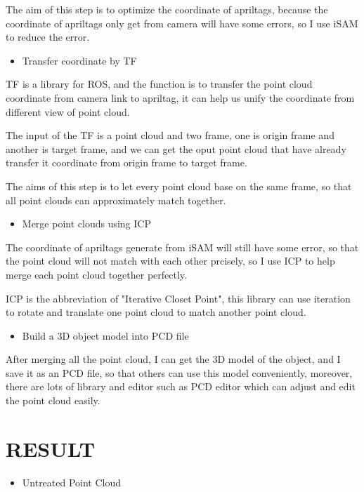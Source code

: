 \documentclass[letterpaper, 10 pt, conference]{ieeeconf}  %
\begin{document}
The aim of this step is to optimize the coordinate of apriltags, because the coordinate of apriltags only get from camera will have some errors, so I use iSAM to reduce the error.
\\
\begin{itemize}
\item Transfer coordinate by TF
\end{itemize}

TF is a library for ROS, and the function is to transfer the point cloud coordinate from camera link to apriltag, it can help us unify the coordinate from different view of point cloud.

The input of the TF is a point cloud and two frame, one is origin frame and another is target frame, and we can get the oput point cloud that have already transfer it coordinate from origin frame to target frame. 

The aims of this step is to let every point cloud base on the same frame, so that all point clouds can approximately match together.
\\
\begin{itemize}
\item Merge point clouds using ICP
\end{itemize}

The coordinate of apriltags generate from iSAM will still have some error, so that the point cloud will not match with each other prcisely, so I use ICP to help merge each point cloud together perfectly.

ICP is the abbreviation of "Iterative Closet Point", this library can use iteration to rotate and translate one point cloud to match another point cloud.
\\
\begin{itemize}
\item Build a 3D object model into PCD file
\end{itemize}

After merging all the point cloud, I can get the 3D model of the object, and I save it as an PCD file, so that others can use this model conveniently, moreover, there are lots of library and editor such as PCD editor which can adjust and edit the point cloud easily.

\section{RESULT}

\begin{itemize}
\item Untreated Point Cloud
\end{itemize}
\end{document}
